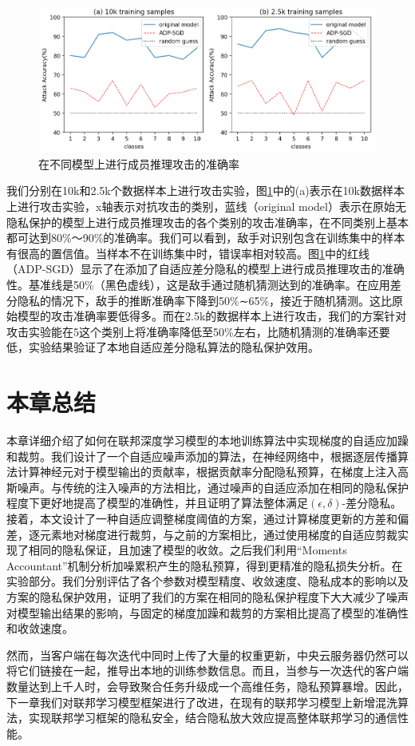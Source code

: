 \begin{figure}[!hbt]
\centering
	\includegraphics[scale=0.5]{fig2/C3/第三章实验三}%
	\caption{在不同模型上进行成员推理攻击的准确率}
	\label{fig:在不同模型上进行成员推理攻击的准确率}	
\end{figure}

我们分别在10k和2.5k个数据样本上进行攻击实验，图\ref{fig:在不同模型上进行成员推理攻击的准确率}中的(a)表示在10k数据样本上进行攻击实验，x轴表示对抗攻击的类别，蓝线（original model）表示在原始无隐私保护的模型上进行成员推理攻击的各个类别的攻击准确率，在不同类别上基本都可达到80\%～90\%的准确率。我们可以看到，敌手对识别包含在训练集中的样本有很高的置信值。当样本不在训练集中时，错误率相对较高。图\ref{fig:在不同模型上进行成员推理攻击的准确率}中的红线（ADP-SGD）显示了在添加了自适应差分隐私的模型上进行成员推理攻击的准确性。基准线是50\%（黑色虚线），这是敌手通过随机猜测达到的准确率。在应用差分隐私的情况下，敌手的推断准确率下降到50\%∼65\%，接近于随机猜测。这比原始模型的攻击准确率要低得多。而在2.5k的数据样本上进行攻击，我们的方案针对攻击实验能在5这个类别上将准确率降低至50\%左右，比随机猜测的准确率还要低，实验结果验证了本地自适应差分隐私算法的隐私保护效用。

\section{本章总结}
本章详细介绍了如何在联邦深度学习模型的本地训练算法中实现梯度的自适应加躁和裁剪。我们设计了一个自适应噪声添加的算法，在神经网络中，根据逐层传播算法计算神经元对于模型输出的贡献率，根据贡献率分配隐私预算，在梯度上注入高斯噪声。与传统的注入噪声的方法相比，通过噪声的自适应添加在相同的隐私保护程度下更好地提高了模型的准确性，并且证明了算法整体满足$(\epsilon, \delta)$-差分隐私。接着，本文设计了一种自适应调整梯度阈值的方案，通过计算梯度更新的方差和偏差，逐元素地对梯度进行裁剪，与之前的方案相比，通过使用梯度的自适应剪裁实现了相同的隐私保证，且加速了模型的收敛。之后我们利用“Moments Accountant”机制分析加噪累积产生的隐私预算，得到更精准的隐私损失分析。在实验部分。我们分别评估了各个参数对模型精度、收敛速度、隐私成本的影响以及方案的隐私保护效用，证明了我们的方案在相同的隐私保护程度下大大减少了噪声对模型输出结果的影响，与固定的梯度加躁和裁剪的方案相比提高了模型的准确性和收敛速度。

然而，当客户端在每次迭代中同时上传了大量的权重更新，中央云服务器仍然可以将它们链接在一起，推导出本地的训练参数信息。而且，当参与一次迭代的客户端数量达到上千人时，会导致聚合任务升级成一个高维任务，隐私预算暴增。因此，下一章我们对联邦学习模型框架进行了改进，在现有的联邦学习模型上新增混洗算法，实现联邦学习框架的隐私安全，结合隐私放大效应提高整体联邦学习的通信性能。



